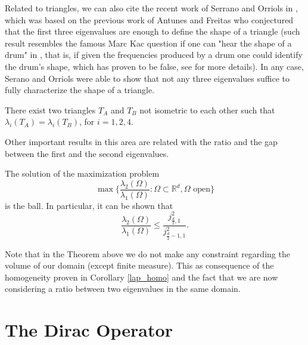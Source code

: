 Related to triangles, we can also cite the recent work of Serrano and Orriols in \cite{gomez2021any}, which was based on the previous work of Antunes and Freitas \cite{antunes2011inverse} who conjectured that the first three eigenvalues are enough to define the shape of a triangle (such result resembles the famous Marc Kac question if one can "hear the shape of a drum" in \cite{kac1966can}, that is, if given the frequencies produced by a drum one could identify the drum's shape, which has proven to be false, see \cite{gordon1992isospectral} for more details). In any case, Serano and Orriols were able to show that not any three eigenvalues suffice to fully characterize the shape of a triangle.
\begin{theorem}
    There exist two triangles \(T_A\) and \(T_B\) not isometric to each other such that \(\lambda_i(T_A) = \lambda_i(T_B)\), for \(i=1, 2, 4\).    
\end{theorem}

Other important results in this area are related with the ratio and the gap between the first and the second eigenvalues.
\begin{theorem}
    The solution of the maximization problem
    \[
    \max \Big\{\frac{\lambda_2(\Omega)}{\lambda_1(\Omega)}: \Omega \subset \mathbb{R}^d, \Omega \text{ open} \Big\}
    \]
    is the ball. In particular, it can be shown that
    \[
    \frac{\lambda_2(\Omega)}{\lambda_1(\Omega)}  \leq \frac{j_{\frac{d}{2},1}^2}{j_{\frac{d}{2}-1,1}^2}.
    \]
\end{theorem}

\begin{remark}
    Note that in the Theorem above we do not make any constraint regarding the volume of our domain (except finite measure). This as consequence of the homogeneity proven in Corollary \eqref{lap_homo} and the fact that we are now considering a ratio between two eigenvalues in the same domain.
\end{remark}


\section{The Dirac Operator}
 
